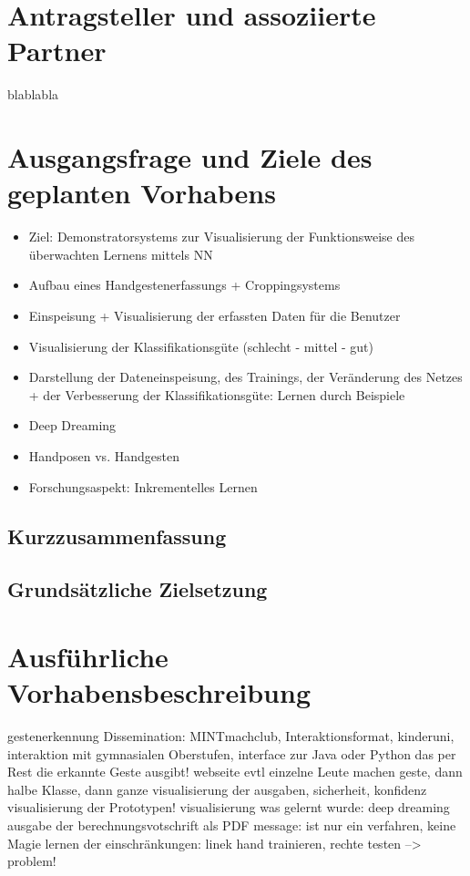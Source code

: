 \documentclass{article}
\begin{document}
\renewcommand{\thesection}{2}
\section{Antragsteller und assoziierte Partner}
blablabla

\renewcommand{\thesection}{3}
\section{Ausgangsfrage und Ziele des geplanten Vorhabens}

\begin{itemize}
	\item Ziel: Demonstratorsystems zur Visualisierung der Funktionsweise des überwachten Lernens mittels NN
	\item Aufbau eines Handgestenerfassungs + Croppingsystems
	\item Einspeisung + Visualisierung der erfassten Daten für die Benutzer
	\item Visualisierung der Klassifikationsgüte (schlecht - mittel - gut)
	\item Darstellung der Dateneinspeisung, des Trainings, der Veränderung des Netzes + der Verbesserung der Klassifikationsgüte: Lernen durch Beispiele
	\item Deep Dreaming
	\item Handposen vs. Handgesten
	\item Forschungsaspekt: Inkrementelles Lernen

\end{itemize}


\subsection{Kurzzusammenfassung}
\subsection{Grundsätzliche Zielsetzung}
%
\renewcommand{\thesection}{4}
\section{Ausführliche Vorhabensbeschreibung}
gestenerkennung
Dissemination: MINTmachclub, Interaktionsformat, kinderuni,
interaktion mit gymnasialen Oberstufen, interface zur Java oder Python das per Rest die erkannte Geste ausgibt!
webseite
evtl einzelne Leute machen geste, dann halbe Klasse, dann ganze
visualisierung der ausgaben, sicherheit, konfidenz
visualisierung der Prototypen!
visualisierung was gelernt wurde: deep dreaming
ausgabe der berechnungsvotschrift als PDF
message: ist nur ein verfahren, keine Magie
lernen der einschränkungen: linek hand trainieren, rechte testen --> problem!
\end{document}
